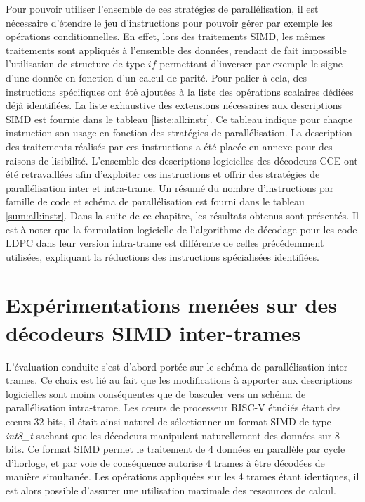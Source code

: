 \documentclass[../main.tex]{subfiles}
\begin{document}
Pour pouvoir utiliser l'ensemble de ces stratégies de parallélisation, il est nécessaire d'étendre le jeu d'instructions pour pouvoir gérer par exemple les opérations conditionnelles. 
En effet, lors des traitements SIMD, les mêmes traitements sont appliqués à l'ensemble des données, rendant de fait impossible l'utilisation de structure de type $if$ permettant d'inverser par exemple le signe d'une donnée en fonction d'un calcul de parité. 
Pour palier à cela, des instructions spécifiques ont été ajoutées à la liste des opérations scalaires dédiées déjà identifiées. 
La liste exhaustive des extensions nécessaires aux descriptions SIMD est fournie dans le tableau \ref{liste:all:instr}.
Ce tableau indique pour chaque instruction son usage en fonction des stratégies de parallélisation. 
La description des traitements réalisés par ces instructions a été placée en annexe pour des raisons de lisibilité. 
L'ensemble des descriptions logicielles des décodeurs CCE ont été retravaillées afin d'exploiter ces instructions et offrir des stratégies de parallélisation inter et intra-trame. 
Un résumé du nombre d'instructions par famille de code et schéma de parallélisation est fourni dans le tableau \ref{sum:all:instr}. 
Dans la suite de ce chapitre, les résultats obtenus sont présentés. Il est à noter que la formulation logicielle de l'algorithme de décodage pour les code LDPC dans leur version intra-trame est différente de celles précédemment utilisées, expliquant la réductions des instructions spécialisées identifiées.

% 
% 
% 
% 
% 
\section{Expérimentations menées sur des décodeurs SIMD inter-trames}
% 
%  
% 
% 
% 

L'évaluation conduite s'est d'abord portée sur le schéma de parallélisation inter-trames. 
Ce choix est lié au fait que les modifications à apporter aux descriptions logicielles sont moins conséquentes que de basculer vers un schéma de parallélisation intra-trame.
Les cœurs de processeur RISC-V étudiés étant des cœurs 32 bits, il était ainsi naturel de sélectionner un format SIMD de type \textit{int8\_t } sachant que les décodeurs manipulent naturellement des données sur 8 bits. 
Ce format SIMD permet le traitement de 4 données en parallèle par cycle d'horloge, et par voie de conséquence autorise 4 trames à être décodées de manière simultanée. 
Les opérations appliquées sur les 4 trames étant identiques, il est alors possible d'assurer une utilisation maximale des ressources de calcul.
\end{document}
